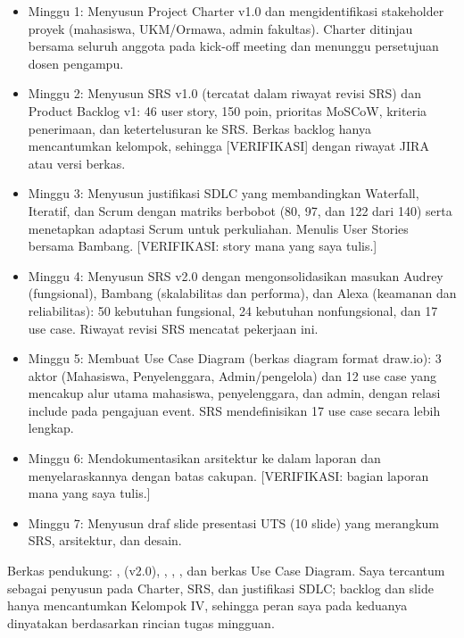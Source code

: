 \documentclass[11pt,a4paper]{article}
\begin{document}
\begin{itemize}

\item Minggu 1: Menyusun Project Charter v1.0 dan mengidentifikasi stakeholder proyek (mahasiswa, UKM/Ormawa, admin fakultas). Charter ditinjau bersama seluruh anggota pada kick-off meeting dan menunggu persetujuan dosen pengampu.

\item Minggu 2: Menyusun SRS v1.0 (tercatat dalam riwayat revisi SRS) dan Product Backlog v1: 46 user story, 150 poin, prioritas MoSCoW, kriteria penerimaan, dan ketertelusuran ke SRS. Berkas backlog hanya mencantumkan kelompok, sehingga [VERIFIKASI] dengan riwayat JIRA atau versi berkas.

\item Minggu 3: Menyusun justifikasi SDLC yang membandingkan Waterfall, Iteratif, dan Scrum dengan matriks berbobot (80, 97, dan 122 dari 140) serta menetapkan adaptasi Scrum untuk perkuliahan. Menulis User Stories bersama Bambang. [VERIFIKASI: story mana yang saya tulis.]

\item Minggu 4: Menyusun SRS v2.0 dengan mengonsolidasikan masukan Audrey (fungsional), Bambang (skalabilitas dan performa), dan Alexa (keamanan dan reliabilitas): 50 kebutuhan fungsional, 24 kebutuhan nonfungsional, dan 17 use case. Riwayat revisi SRS mencatat pekerjaan ini.

\item Minggu 5: Membuat Use Case Diagram (berkas diagram format draw.io): 3 aktor (Mahasiswa, Penyelenggara, Admin/pengelola) dan 12 use case yang mencakup alur utama mahasiswa, penyelenggara, dan admin, dengan relasi \guillemotleft{}include\guillemotright{} pada pengajuan event. SRS mendefinisikan 17 use case secara lebih lengkap.

\item Minggu 6: Mendokumentasikan arsitektur ke dalam laporan dan menyelaraskannya dengan batas cakupan. [VERIFIKASI: bagian laporan mana yang saya tulis.]

\item Minggu 7: Menyusun draf slide presentasi UTS (10 slide) yang merangkum SRS, arsitektur, dan desain.

\end{itemize}

Berkas pendukung: ,  (v2.0), , , , dan berkas Use Case Diagram. Saya tercantum sebagai penyusun pada Charter, SRS, dan justifikasi SDLC; backlog dan slide hanya mencantumkan Kelompok IV, sehingga peran saya pada keduanya dinyatakan berdasarkan rincian tugas mingguan.
\end{document}
